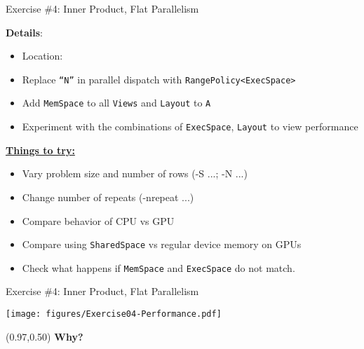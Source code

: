 \begin{frame}[fragile]{Exercise \#4: Inner Product, Flat Parallelism}

  \textbf{Details}:
  \begin{small}
  \begin{itemize}
\item Location: 
\item Replace \texttt{``N''} in parallel dispatch with \texttt{RangePolicy<ExecSpace>}
\item Add \texttt{MemSpace} to all \texttt{Views} and \texttt{Layout} to \texttt{A}
\item Experiment with the combinations of \texttt{ExecSpace}, \texttt{Layout} to view performance
\end{itemize}
  \end{small}


\ul{\textbf{Things to try:}}
  \begin{small}
  \begin{itemize}
  \item Vary problem size and number of rows (-S ...; -N ...)
  \item Change number of repeats (-nrepeat ...)
  \item Compare behavior of CPU vs GPU
  \item Compare using \texttt{SharedSpace} vs regular device memory on GPUs
  \item Check what happens if \texttt{MemSpace} and \texttt{ExecSpace} do not match.
  \end{itemize}
  \end{small}
\end{frame}


\begin{frame}[fragile]{Exercise \#4: Inner Product, Flat Parallelism}


  \vspace{-10pt}

    \texttt{[image: figures/Exercise04-Performance.pdf]}

  \vspace{-15pt}

  \begin{textblock*}{0.5\textwidth}(0.97\textwidth,0.50\textheight)
    \textbf{\LARGE Why?}
  \end{textblock*}

\end{frame}


